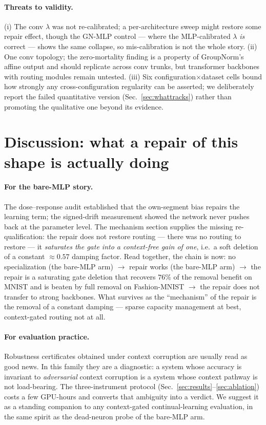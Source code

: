 \documentclass[review,12pt,number]{elsarticle}
\begin{document}
\paragraph{Threats to validity.} (i) The conv $\lambda$ was not
re-calibrated; a per-architecture sweep might restore some repair
effect, though the GN-MLP control --- where the MLP-calibrated
$\lambda$ \emph{is} correct --- shows the same collapse, so
mis-calibration is not the whole story. (ii) One conv topology; the
zero-mortality finding is a property of GroupNorm's affine output and
should replicate across conv trunks, but transformer backbones with
routing modules remain untested. (iii) Six configuration$\times$dataset
cells bound how strongly any cross-configuration regularity can be
asserted; we deliberately report the failed quantitative version
(Sec.~\ref{sec:whattracks}) rather than promoting the qualitative one
beyond its evidence.



\section{Discussion: what a repair of this shape is actually doing}
\label{sec:repair-disc}

\paragraph{For the bare-MLP story.} The dose--response audit established that
the own-segment bias repairs the learning term; the signed-drift measurement showed the network never pushes back at the parameter level.
The mechanism section supplies the missing re-qualification: the repair does not
restore routing --- there was no routing to restore --- it \emph{saturates
the gate into a context-free gain of one}, i.e.\ a soft deletion of a
constant ${\approx}0.57$ damping factor. Read together, the chain is
now: no specialization (the bare-MLP arm) $\to$ repair works (the bare-MLP arm) $\to$ the repair is
a saturating gate deletion that recovers $76\%$ of the removal benefit
on MNIST and is beaten by full removal on Fashion-MNIST $\to$ the repair does not transfer to strong backbones. What
survives as the ``mechanism'' of the repair is the removal of a constant
damping --- sparse capacity management at best, context-gated routing
not at all.

\paragraph{For evaluation practice.} Robustness certificates obtained
under context corruption are usually read as good news. In this family
they are a diagnostic: a system whose accuracy is invariant to
\emph{adversarial} context corruption is a system whose context pathway
is not load-bearing. The three-instrument protocol
(Sec.~\ref{sec:results}--\ref{sec:ablation}) costs a few GPU-hours and
converts that ambiguity into a verdict. We suggest it as a standing
companion to any context-gated continual-learning evaluation, in the
same spirit as the dead-neuron probe of the bare-MLP arm.
\end{document}
